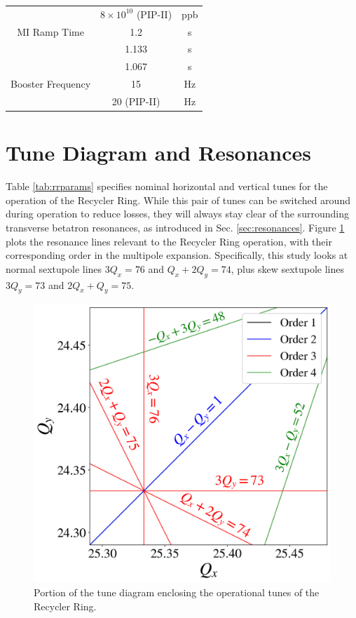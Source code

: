 \begin{table}[H]
\begin{tabular}{@{}ccc@{}}
                               & $8\times10^{10}$ (PIP-II)                  & ppb           \\
   MI Ramp Time                & 1.2                                        & s             \\
                               & 1.133                                      & s             \\
                               & 1.067                                      & s             \\
   Booster Frequency           & 15                                         & Hz            \\
                               & 20 (PIP-II)                                & Hz            \\ \bottomrule
   \end{tabular}
   \end{table}

\section{Tune Diagram and Resonances}

Table \ref{tab:rrparams} specifies nominal horizontal and vertical tunes for the operation of the Recycler Ring. While this pair of tunes can be switched around during operation to reduce losses, they will always stay clear of the surrounding transverse betatron resonances, as introduced in Sec. \ref{sec:resonances}. Figure \ref{fig:rrtd} plots the resonance lines relevant to the Recycler Ring operation, with their corresponding order in the multipole expansion. Specifically, this study looks at normal sextupole lines $3 Q_x=76$ and $Q_x+2Q_y=74$, plus skew sextupole lines $3 Q_y=73$ and $2 Q_x+Q_y=75$.

\begin{figure}[H]
   \centering
   \includegraphics[width=\columnwidth]{chapter3/rrtd.png}
   \caption{Portion of the tune diagram enclosing the operational tunes of the Recycler Ring.}
   \label{fig:rrtd}
\end{figure}

